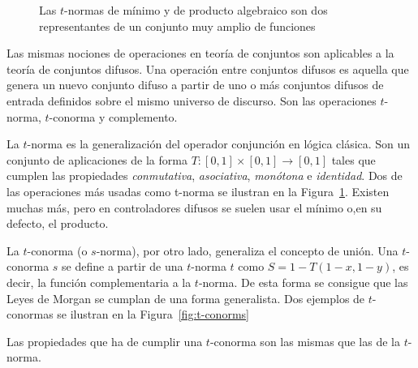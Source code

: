 \begin{figure}
	\centering
	\qquad
	\caption[$t$-normas del mínimo y del producto algebraico.]{Las $t$-normas de mínimo y de producto algebraico son dos representantes de un conjunto muy amplio de funciones}
	\label{fig:t-norms}
\end{figure}

Las mismas nociones de operaciones en teoría de conjuntos son aplicables a la teoría de conjuntos difusos. Una operación entre conjuntos difusos es aquella que genera un nuevo conjunto difuso a partir de uno o más conjuntos difusos de entrada definidos sobre el mismo universo de discurso. Son las operaciones $t$-norma, $t$-conorma y complemento.

La $t$-norma es la generalización del operador conjunción en lógica clásica. Son un conjunto de aplicaciones de la forma $T: [0, 1] \times [0, 1] \rightarrow [0, 1]$ tales que cumplen las propiedades \textit{conmutativa}, \textit{asociativa}, \textit{monótona} e \textit{identidad}. Dos de las operaciones más usadas como t-norma se ilustran en la Figura~\ref{fig:t-norms}. Existen muchas más, pero en controladores difusos se suelen usar el mínimo o,en su defecto, el producto.

La $t$-conorma (o $s$-norma), por otro lado, generaliza el concepto de unión. Una $t$-conorma $s$ se define a partir de una $t$-norma $t$ como $S = 1 - T(1-x, 1-y)$, es decir, la función complementaria a la $t$-norma. De esta forma se consigue que las Leyes de Morgan se cumplan de una forma generalista. Dos ejemplos de $t$-conormas se ilustran en la Figura~\ref{fig:t-conorms}

Las propiedades que ha de cumplir una $t$-conorma son las mismas que las de la $t$-norma.

